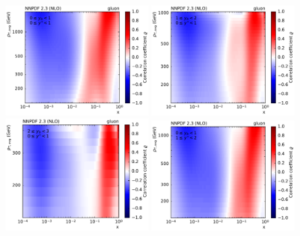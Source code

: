 \begin{figure}[h!tbp]
    \centering
    \includegraphics[width=0.49\textwidth]{figures/pdf_constraints/corr_PTMAXEXPYS_YBYS_NLO_FINALBINS_NNPDF23_gluon_ys0_0yb0_0_cl.pdf}\hfill
    \includegraphics[width=0.49\textwidth]{figures/pdf_constraints/corr_PTMAXEXPYS_YBYS_NLO_FINALBINS_NNPDF23_gluon_ys0_0yb1_0_cl.pdf}\hfill
    \includegraphics[width=0.49\textwidth]{figures/pdf_constraints/corr_PTMAXEXPYS_YBYS_NLO_FINALBINS_NNPDF23_gluon_ys0_0yb2_0_cl.pdf}\hfill
    \includegraphics[width=0.49\textwidth]{figures/pdf_constraints/corr_PTMAXEXPYS_YBYS_NLO_FINALBINS_NNPDF23_gluon_ys1_0yb0_0_cl.pdf}\hfill

\end{figure}
